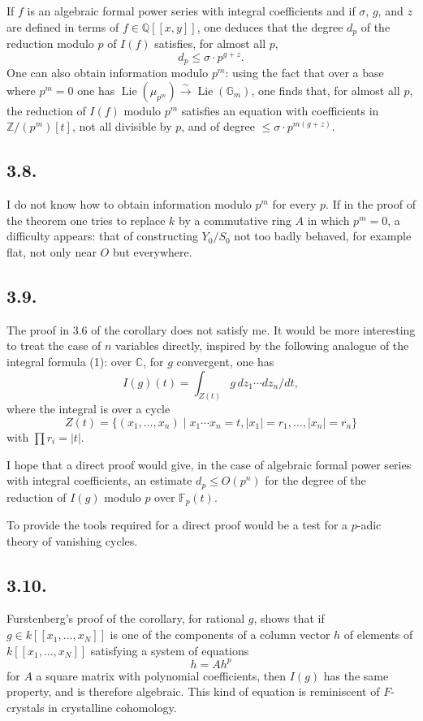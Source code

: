 \documentclass[11pt]{article}
\DeclareMathOperator{\Lie}{Lie}
\newcommand{\CC}{\mathbb C}
\newcommand{\GG}{\mathbb G}
\newcommand{\FF}{\mathbb F}
\newcommand{\ZZ}{\mathbb Z}
\newcommand{\QQ}{\mathbb Q}
\begin{document}
If $f$ is an algebraic formal power series with integral coefficients and if $\sigma$, $g$, and $z$ are defined in terms of $f\in\QQ[[x,y]]$, one deduces that the degree $d_p$ of the reduction modulo $p$ of $I(f)$ satisfies, for almost all $p$,
\begin{equation}
        d_p\le\sigma\cdot p^{g+z}. \tag{3.7.2}
\end{equation}
One can also obtain information modulo $p^m$: using the fact that over a base where $p^m=0$ one has $\Lie(\mu_{p^m})\xrightarrow{\sim}\Lie(\GG_m)$, one finds that, for almost all $p$, the reduction of $I(f)$ modulo $p^m$ satisfies an equation with coefficients in $\ZZ/(p^m)[t]$, not all divisible by $p$, and of degree $\le\sigma\cdot p^{m(g+z)}$.

\subsection*{3.8.}
I do not know how to obtain information modulo $p^m$ for every $p$. If in the proof of the theorem one tries to replace $k$ by a commutative ring $A$ in which $p^m=0$, a difficulty appears: that of constructing $Y_0/S_0$ not too badly behaved, for example flat, not only near $O$ but everywhere.

\subsection*{3.9.}
The proof in 3.6 of the corollary does not satisfy me. It would be more interesting to treat the case of $n$ variables directly, inspired by the following analogue of the integral formula (1): over $\CC$, for $g$ convergent, one has
\begin{equation}
        I(g)(t)=\int_{Z(t)}g\,dz_1\cdots dz_n/dt, \tag{$1'$}
\end{equation}
where the integral is over a cycle
\[
        Z(t)=\{(x_1,\ldots,x_n)\mid x_1\cdots x_n=t,
        |x_1|=r_1,\ldots,|x_n|=r_n\}
\]
with $\prod r_i=|t|$.

I hope that a direct proof would give, in the case of algebraic formal power series with integral coefficients, an estimate $d_p\le O(p^n)$ for the degree of the reduction of $I(g)$ modulo $p$ over $\FF_p(t)$.

To provide the tools required for a direct proof would be a test for a $p$-adic theory of vanishing cycles.

\subsection*{3.10.}
Furstenberg's proof of the corollary, for rational $g$, shows that if $g\in k[[x_1,\ldots,x_N]]$ is one of the components of a column vector $h$ of elements of $k[[x_1,\ldots,x_N]]$ satisfying a system of equations
\[
        h=Ah^p
\]
for $A$ a square matrix with polynomial coefficients, then $I(g)$ has the same property, and is therefore algebraic. This kind of equation is reminiscent of $F$-crystals in crystalline cohomology.
\end{document}
